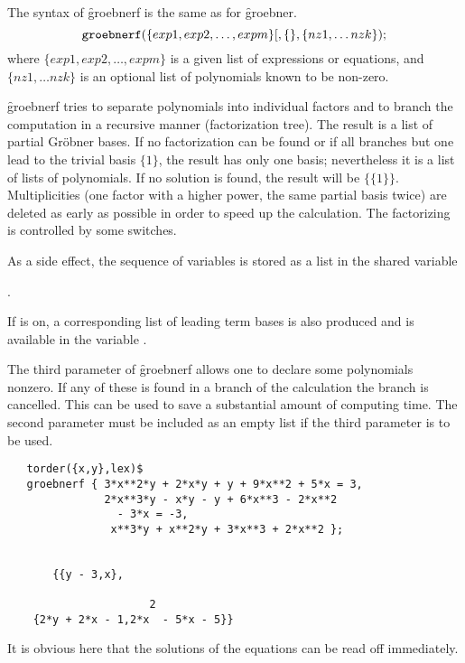 
The syntax of \f{groebnerf} is the same as for \f{groebner}.
\[ \texttt{groebnerf}(\{exp1, exp2, \ldots , expm\}
         [,\{\},\{nz1, \ldots nzk\}); \]
where $\{exp1, exp2, \ldots , expm\} $ is a given list of expressions or
equations, and $\{nz1, \ldots nzk\}$ is
an optional list of polynomials known to be non-zero.

\f{groebnerf} tries to separate polynomials into individual factors and
to branch the computation in a recursive manner (factorization tree).
The result is a list of partial Gr\"obner bases. If no factorization can
be found or if all branches but one lead to the trivial basis $\{1\}$,
the result has only one basis; nevertheless it is a list of lists of
polynomials. If no solution is found, the result will be $\{\{1\}\}$.
Multiplicities (one factor with a higher power, the same partial basis
twice) are deleted as early as possible in order to speed up the
calculation. The factorizing is controlled by some switches.

As a side effect, the sequence of variables is stored as a \REDUCE list in
the shared variable
\begin{center}
 .
\end{center}
If  is on, a corresponding list of leading term bases is
also produced and is available in the variable .

The third parameter of \f{groebnerf} allows one to declare some polynomials
nonzero. If any of these is found in a branch of the calculation
the branch is cancelled. This can be used to save a substantial amount
of computing time. The second parameter must be included as an
empty list if the third parameter is to be used.

\begin{verbatim}
   torder({x,y},lex)$
   groebnerf { 3*x**2*y + 2*x*y + y + 9*x**2 + 5*x = 3,
               2*x**3*y - x*y - y + 6*x**3 - 2*x**2
                 - 3*x = -3,
                x**3*y + x**2*y + 3*x**3 + 2*x**2 };


       {{y - 3,x},

                      2
    {2*y + 2*x - 1,2*x  - 5*x - 5}}
\end{verbatim}
It is obvious here that the solutions of the equations can be read
off immediately.

